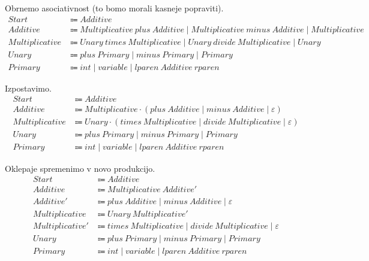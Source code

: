 \documentclass{report}
\newcommand{\Null}{\varepsilon}
\newcommand{\Seq}{\cdot}
\newcommand{\Spc}{\ }
\newcommand{\Union}{\mathrel{|}}
\newcommand{\Arrow}{\Coloneq}
\newcommand{\NT}[1]{{#1}}
\newcommand{\T}[1]{{#1}}
\begin{document}
    Obrnemo asociativnost (to bomo morali kasneje popraviti).
    \begin{align*}
      \NT{Start} &\Arrow \NT{Additive}\\
      \NT{Additive} &\Arrow \NT{Multiplicative} \Spc \T{plus} \Spc \NT{Additive} \Union \NT{Multiplicative} \Spc \T{minus} \Spc \NT{Additive} \Union \NT{Multiplicative}\\
      \NT{Multiplicative} &\Arrow \NT{Unary} \Spc \T{times} \Spc \NT{Multiplicative} \Union \NT{Unary} \Spc \T{divide} \Spc \NT{Multiplicative} \Union \NT{Unary}\\
      \NT{Unary} &\Arrow \T{plus} \Spc \NT{Primary} \Union \T{minus} \Spc \NT{Primary} \Union \NT{Primary}\\ 
      \NT{Primary} &\Arrow \T{int} \Union \T{variable} \Union \T{lparen} \Spc \NT{Additive} \Spc \T{rparen}
    \end{align*}

    Izpostavimo.
    \begin{align*}
      \NT{Start} &\Arrow \NT{Additive}\\
      \NT{Additive} &\Arrow \NT{Multiplicative} \Seq (\T{plus} \Spc \NT{Additive} \Union \T{minus} \Spc \NT{Additive} \Union \Null)\\
      \NT{Multiplicative} &\Arrow \NT{Unary} \Seq (\T{times} \Spc \NT{Multiplicative} \Union \T{divide} \Spc \NT{Multiplicative} \Union \Null)\\
      \NT{Unary} &\Arrow \T{plus} \Spc \NT{Primary} \Union \T{minus} \Spc \NT{Primary} \Union \NT{Primary}\\ 
      \NT{Primary} &\Arrow \T{int} \Union \T{variable} \Union \T{lparen} \Spc \NT{Additive} \Spc \T{rparen}
    \end{align*}

    Oklepaje spremenimo v novo produkcijo.
    \begin{align*}
      \NT{Start} &\Arrow \NT{Additive}\\
      \NT{Additive} &\Arrow \NT{Multiplicative} \Spc \NT{Additive'}\\
      \NT{Additive'} &\Arrow \T{plus} \Spc \NT{Additive} \Union \T{minus} \Spc \NT{Additive} \Union \Null\\
      \NT{Multiplicative} &\Arrow \NT{Unary} \Spc \NT{Multiplicative'}\\
      \NT{Multiplicative'} &\Arrow \T{times} \Spc \NT{Multiplicative} \Union \T{divide} \Spc \NT{Multiplicative} \Union \Null\\
      \NT{Unary} &\Arrow \T{plus} \Spc \NT{Primary} \Union \T{minus} \Spc \NT{Primary} \Union \NT{Primary}\\ 
      \NT{Primary} &\Arrow \T{int} \Union \T{variable} \Union \T{lparen} \Spc \NT{Additive} \Spc \T{rparen}
    \end{align*}
\end{document}
